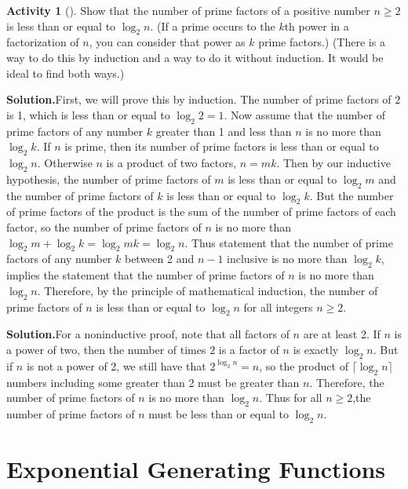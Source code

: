 \documentclass[10pt,]{book}
\theoremstyle{plain}
\theoremstyle{definition}
\newtheorem{activity}[project]{Activity}
\numberwithin{equation}{chapter}
\begin{document}
\begin{activity}[]\label{activity-349}
Show that the number of prime factors of a positive number \(n\ge 2\) is less than or equal to \(\log_2 n\).  (If a prime occurs to the \(k\)th power in a factorization of \(n\), you can consider that power as \(k\) prime factors.)  (There is a way to do this by induction and a way to do it without induction.  It would be ideal to find both ways.)%
\par\medskip\noindent%
\textbf{Solution.}\quad First, we will prove this by induction. The number of prime factors of \(2\) is 1, which is less than or equal to \(\log_2 2=1\). Now assume that the number of prime factors of any number \(k\) greater than 1 and less than \(n\) is no more than \(\log_2 k\). If \(n\) is prime, then its number of prime factors is less than or equal to \(\log_2 n\). Otherwise \(n\) is a product of two factors, \(n=mk\). Then by our inductive hypothesis, the number of prime factors of \(m\) is less than or equal to \(\log_2 m\) and the number of prime factors of \(k\) is less than or equal to \(\log_2 k\). But the number of prime factors of the product is the sum of the number of prime factors of each factor, so the number of prime factors of \(n\) is no more than \(\log_2 m +\log_2 k=\log_2 mk= \log_2 n\). Thus statement that the number of prime factors of any number \(k\) between 2 and \(n-1\) inclusive is no more than \(\log_2 k\), implies the statement that the number of prime factors of \(n\) is no more than \(\log_2 n\). Therefore, by the principle of mathematical induction, the number of prime factors of \(n\) is less than or equal to \(\log_2 n\) for all integers \(n\ge 2\).%
\par\medskip\noindent%
\textbf{Solution.}\quad For a noninductive proof, note that all factors of \(n\) are at least 2. If \(n\) is a power of two, then the number of times \(2\) is a factor of \(n\) is exactly \(\log_2 n\). But if \(n\) is not a power of 2, we still have that \(2^{\log_2 n}=n\), so the product of \(\lceil\log_2 n\rceil\) numbers including some greater than 2 must be greater than \(n\). Therefore, the number of prime factors of \(n\) is no more than \(\log_2 n\). Thus for all \(n\ge2\),the number of prime factors of \(n\) must be less than or equal to \(\log_2 n\).%
\end{activity}
%
\backmatter
%
\typeout{************************************************}
\typeout{************************************************}
\chapter[{Exponential Generating Functions}]{Exponential Generating Functions}\label{expogenfun}
\typeout{************************************************}
\typeout{************************************************}
\end{document}
